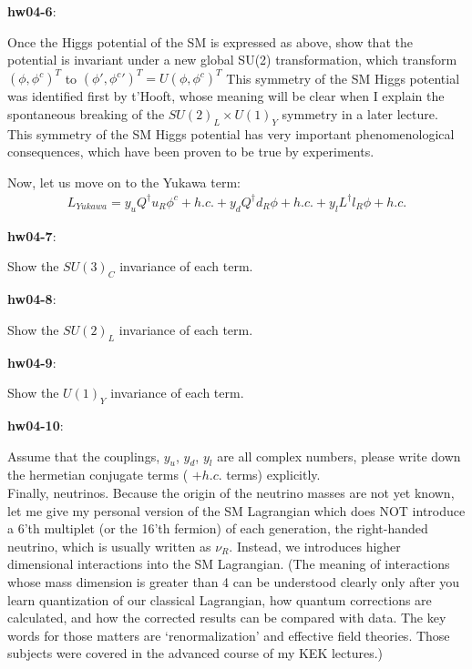 \documentclass[12pt]{article}
\begin{document}
{\bf hw04-6}:

  Once the Higgs potential of the SM is expressed as above,
  show that the potential is invariant under a new global
  SU(2) transformation, which transform
$ ( \phi, \phi^c )^T$
  to
  $( \phi', {\phi^c}' )^T
  =
  U ( \phi, \phi^c )^T$
  This symmetry of the SM Higgs potential was identified
  first by t'Hooft, whose meaning will be clear when I explain
  the spontaneous breaking of the $SU(2)_L \times U(1)_Y$
  symmetry in a later lecture.  This symmetry of the SM
  Higgs potential has very important phenomenological
  consequences, which have been proven to be true
  by experiments.

Now, let us move on to the Yukawa term:
\begin{eqnarray}
    L_{Yukawa}
    = {y_u Q^\dagger u_R \phi^c + h.c.}
    + {y_d Q^\dagger d_R \phi   + h.c.}
    + {y_l L^\dagger l_R \phi   + h.c.}
\end{eqnarray}
 

{\bf hw04-7}:

  Show the $SU(3)_C$ invariance of each term.

{\bf hw04-8}:

  Show the $SU(2)_L$ invariance of each term.

{\bf hw04-9}:

  Show the $U(1)_Y$ invariance of each term.

{\bf hw04-10}:

  Assume that the couplings, $y_u$, $y_d$, $y_l$ are all
  complex numbers, please write down the hermetian
  conjugate terms ( $+ h.c.$ terms) explicitly.\\

  Finally, neutrinos.  Because the origin of the
  neutrino masses are not yet known, let me give
  my personal version of the SM Lagrangian which
  does NOT introduce a 6'th multiplet (or the 16'th
  fermion) of each generation, the right-handed neutrino,
  which is usually written as $\nu_R$.  Instead, we
  introduces higher dimensional interactions into
  the SM Lagrangian.  (The meaning of interactions
  whose mass dimension is greater than 4 can be
  understood clearly only after you learn quantization
  of our classical Lagrangian, how quantum corrections
  are calculated, and how the corrected results can be
  compared with data.  The key words for those matters
  are `renormalization' and effective field theories.
  Those subjects were covered in the advanced course
  of my KEK lectures.)\\
\end{document}
